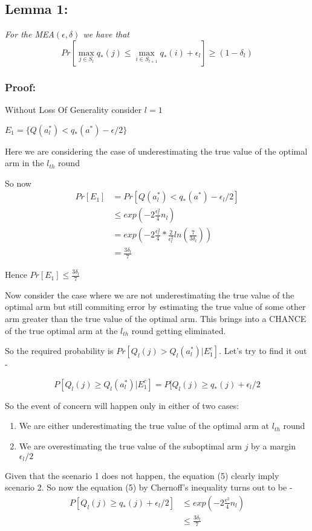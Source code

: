 \documentclass[english]{article}
\begin{document}
\subsection*{Lemma 1:}

\textit{For the MEA$(\epsilon,\delta)$ we have that}
\[
Pr[\max_{j\in S_{l}}q_{*}(j)\leq\max_{i\in S_{l+1}}q_{*}(i)+\epsilon_{l}]\geq(1-\delta_{l})
\]

\subsubsection*{Proof: }

Without Loss Of Generality consider $l=1$

$E_{1}=\{Q(a_{l}^{*})<q_{*}(a^{*})-\epsilon/2\}$

Here we are considering the case of underestimating the true value
of the optimal arm in the $l_{th}$ round

So now
\begin{align}
Pr[E_{1}] & =Pr[Q(a_{l}^{*})<q_{*}(a^{*})-\epsilon_{l}/2]\label{Using Chernoff inequality}\\
 & \leq exp(-2\frac{\epsilon_{l}^{2}}{4}n_{l})\\
 & =exp(-2\frac{\epsilon_{l}^{2}}{4}*\frac{2}{\epsilon_{l}^{2}}ln(\frac{7}{3\delta_{l}}))\\
 & =\frac{3\delta_{l}}{7}
\end{align}

Hence $Pr[E_{1}]\leq\frac{3\delta_{l}}{7}$

Now consider the case where we are not underestimating the true value
of the optimal arm but still commiting error by estimating the true
value of some other arm greater than the true value of the optimal
arm. This brings into a CHANCE of the true optimal arm at the $l_{th}$
round getting eliminated.

So the required probability is $Pr[Q_{l}(j)>Q_{l}(a_{l}^{*})|E_{1}^{c}]$.
Let's try to find it out - 

\begin{equation}
P[Q_{l}(j)\geq Q_{l}(a_{l}^{*})|E_{1}^{c}]=P[Q_{l}(j)\geq q_{*}(j)+\epsilon_{l}/2
\end{equation}

So the event of concern will happen only in either of two cases:
\begin{enumerate}
\item We are either underestimating the true value of the optimal arm at
$l_{th}$ round
\item We are overestimating the true value of the suboptimal arm $j$ by
a margin $\epsilon_{l}/2$ 
\end{enumerate}
Given that the scenario 1 does not happen, the equation (5) clearly
imply scenario 2. So now the equation (5) by Chernoff's inequality
turns out to be - 
\begin{align*}
P[Q_{l}(j)\geq q_{*}(j)+\epsilon_{l}/2] & \leq exp(-2\frac{\epsilon^{2}}{4}n_{l})\\
 & \leq\frac{3\delta_{l}}{7}
\end{align*}
\end{document}
